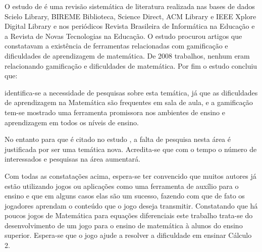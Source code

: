 O estudo de \cite{revbibmatgam} é uma revisão sistemática de literatura realizada nas bases de dados Scielo Library, BIREME Biblioteca, Science Direct, ACM Library e IEEE Xplore Digital Library e nos periódicos Revista Brasileira de Informática na Educação e a Revista de Novas Tecnologias na Educação. O estudo procurou artigos que constatavam a existência de ferramentas relacionadas com gamificação e dificuldades de aprendizagem de matemática. De 2008 trabalhos, nenhum eram relacionando gamificação e dificuldades de matemática. Por fim o estudo concluiu que:

\begin{citacao}
identifica-se a necessidade de pesquisas sobre esta temática, já que as dificuldades de aprendizagem na Matemática são frequentes em sala de aula, e a gamificação tem-se mostrado uma ferramenta promissora nos ambientes de ensino e aprendizagem em todos os níveis de ensino. 
\end{citacao}

No entanto para \cite{dicheva} que é citado no estudo \cite{revbibmatgam}, a falta de pesquisa nesta área é justificada por ser uma temática nova. Acredita-se que com o tempo o número de interessados e pesquisas na área aumentará.

Com todas as constatações acima, espera-se ter convencido que muitos autores já estão utilizando jogos ou aplicações como uma ferramenta de auxílio para o ensino e que em alguns casos elas são um sucesso, fazendo com que de fato os jogadores aprendam o conteúdo que o jogo deseja transmitir. Constatando que há poucos jogos de Matemática para equações diferenciais este trabalho trata-se do desenvolvimento de um jogo para o ensino de matemática à alunos do ensino superior. Espera-se que o jogo ajude a resolver a dificuldade em ensinar Cálculo 2.
